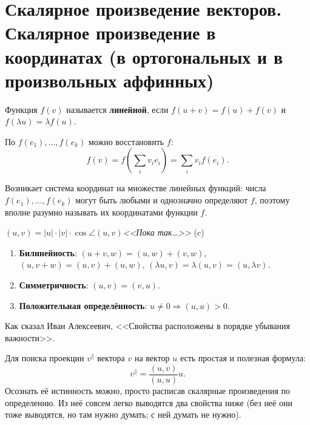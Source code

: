 \section{Скалярное произведение векторов. Скалярное произведение в координатах (в ортогональных и в произвольных аффинных)}

\begin{definition}
    Функция $f(v)$ называется \textbf{линейной}, если $f(u + v) = f(u) + f(v)$ и $f(\lambda u) = \lambda f(u)$.
\end{definition}

По $f(e_1), \ldots, f(e_k)$ можно восстановить $f$:
$$f(v) = f\left(\sum_iv_ie_i\right) = \sum_iv_if(e_i).$$

Возникает система координат на множестве линейных функций: числа $f(e_1), \ldots, f(e_k)$ могут быть любыми и однозначно определяют $f$, поэтому вполне разумно называть их координатами функции $f$.

\begin{definition}
    $(u, v) = |u| \cdot |v| \cdot \cos\angle(u, v)$\hfill\textit{<<Пока так\ldots>>} (c)
\end{definition}

\begin{statement}

    \begin{enumerate}
        \item \textbf{Билинейность}: $(u + v, w) = (u, w) + (v, w)$, $(u, v + w) = (u, v) + (u, w)$, $(\lambda u, v) = \lambda (u, v) = (u, \lambda v)$.
        \item \textbf{Симметричность}: $(u, v) = (v, u)$.
        \item \textbf{Положительная определённость}: $u \ne 0 \Rightarrow (u, u) > 0$.
    \end{enumerate}

    Как сказал Иван Алексеевич, <<Свойства расположены в порядке убывания важности>>.
\end{statement}


\begin{remark}
    Для поиска проекции $v^\parallel$ вектора $v$ на вектор $u$ есть простая и полезная формула:
    $$v^\parallel = \frac{(u, v)}{(u, u)}u.$$
    Осознать её истинность можно, просто расписав скалярные произведения по определению. Из неё совсем легко выводятся два свойства ниже (без неё они тоже выводятся, но там нужно думать; с ней думать не нужно).
\end{remark}

